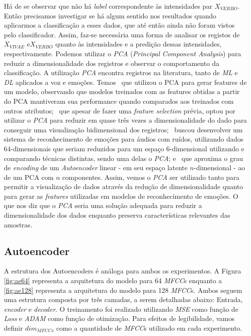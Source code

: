 Há de se observar que não há \textit{label} correspondente às intensidades par $X_{VERBO}$. Então precisamos investigar se há algum sentido nos resultados quando aplicarmos a classificação a esses dados, que até então ainda não foram vistos pelo classificador. Assim, faz-se necessária uma forma de analisar os registos de $X_{VIVAE}$ e$X_{VERBO}$ quanto às intensidades e a predição dessas intensidades, respectivamente. Podemos utilizar o \textit{PCA} (\textit{Principal Component Analysis}) para reduzir a dimensionalidade dos registros e observar o comportamento da classificação. A utilização \textit{PCA} encontra registros na literatura, tanto de \textit{ML} e \textit{DL} aplicados a voz e emoções. Temos~\cite{pca1} que utilizou o PCA para gerar features de um modelo, observando que modelos treinados com as features obtidas a partir do PCA mantiveram sua performance quando comparados aos treinados com outros atributos;~\cite{pca2} que apesar de fazer uma \textit{feature selection} prévia, optou por utilizar o \textit{PCA} para reduzir em quase três vezes a dimensionalidade do dado para conseguir uma visualização bidimensional dos registros;~\cite{pca3} buscou desenvolver um sistema de reconhecimento de emoções para áudios com ruídos, utilizando dados $64$-dimensionais que seriam reduzidos para um espaço $6$-dimensional utilizando e comparando técnicas distintas, sendo uma delas o \textit{PCA}; e~\cite{pca5} que aproxima o grau de \textit{encoding} de um \textit{Autoencoder} linear - em seu espaço latente $n$-dimensional - ao de um PCA com $n$ componentes. Assim, vemos o \textit{PCA} ser utilizado tanto para permitir a visualização de dados através da redução de dimensionalidade quanto para gerar as \textit{features} utilizadas em modelos de reconhecimento de emoções. O que nos diz que o \textit{PCA} seria uma solução adequada para reduzir a dimensionalidade dos dados enquanto preserva características relevantes das amostras.

\subsection{Autoencoder}

A estrutura dos Autoencoders é análoga para ambos os experimentos. A Figura \ref{fig:ae64} representa a arquitetura do modelo para 64 \textit{MFCC}s enquanto a \ref{fig:ae128} representa a arquitetura do modelo para 128 \textit{MFCC}s. Ambos seguem uma estrutura composta por três camadas, a serem detalhadas abaixo: Entrada, \textit{encoder} e \textit{decoder}. O treinamento foi realizado utilizando \textit{MSE} como função de \textit{Loss} e \textit{ADAM} como função de otimização. Para efeitos de legibilidade, vamos definir $dim_{MFCCs}$ como a quantidade de \textit{MFCC}s utilizado em cada experimento.

